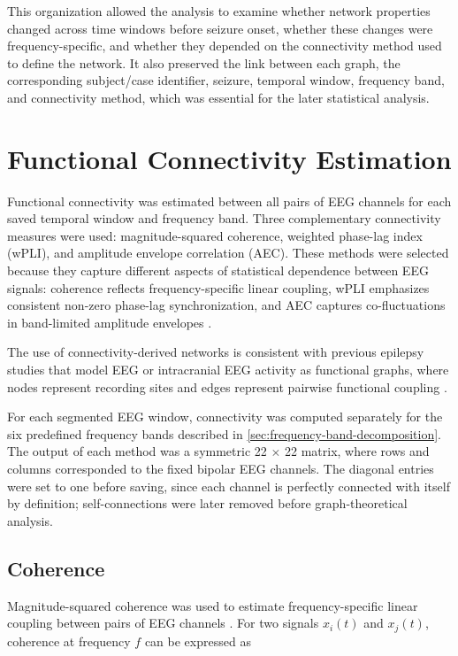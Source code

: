 This organization allowed the analysis to examine whether network properties
changed across time windows before seizure onset, whether these changes were
frequency-specific, and whether they depended on the connectivity method used
to define the network. It also preserved the link between each graph, the
corresponding subject/case identifier, seizure, temporal window, frequency
band, and connectivity method, which was essential for the later statistical
analysis.

\section{Functional Connectivity Estimation}
\label{sec:functional-connectivity-estimation}

Functional connectivity was estimated between all pairs of EEG channels for
each saved temporal window and frequency band. Three complementary
connectivity measures were used: magnitude-squared coherence, weighted
phase-lag index (wPLI), and amplitude envelope correlation (AEC). These
methods were selected because they capture different aspects of statistical
dependence between EEG signals: coherence reflects frequency-specific linear
coupling, wPLI emphasizes consistent non-zero phase-lag synchronization, and
AEC captures co-fluctuations in band-limited amplitude envelopes
\cite{Friston1994,Vinck2011,Bruns2000}.

The use of connectivity-derived networks is consistent with previous epilepsy
studies that model EEG or intracranial EEG activity as functional graphs, where
nodes represent recording sites and edges represent pairwise functional
coupling \cite{Vecchio2016,Lanzone2022}.

For each segmented EEG window, connectivity was computed separately for the
six predefined frequency bands described in
\cref{sec:frequency-band-decomposition}. The output of each method was a
symmetric \num{22} $\times$ \num{22} matrix, where rows and columns corresponded
to the fixed bipolar EEG channels. The diagonal entries were set to one before
saving, since each channel is perfectly connected with itself by definition;
self-connections were later removed before graph-theoretical analysis.

\subsection{Coherence}
\label{subsec:coherence}

Magnitude-squared coherence was used to estimate frequency-specific linear
coupling between pairs of EEG channels \cite{Pfurtscheller1999,Vecchio2016}. For two signals $x_i(t)$ and $x_j(t)$,
coherence at frequency $f$ can be expressed as


